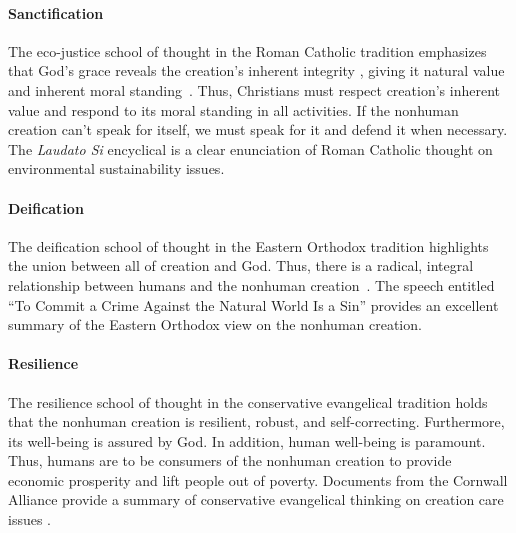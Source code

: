 \documentclass[12pt]{article}
\begin{document}
\paragraph{Sanctification} 
\label{sec:sanctification}

The eco-justice school of thought in the Roman Catholic tradition
emphasizes that God's grace reveals the creation's 
inherent integrity \autocite[19]{Jenkins:2008}, 
giving it natural value and inherent moral standing~\autocite{Joldersma:2019}. 
Thus, Christians must respect creation's inherent value and 
respond to its moral standing in all activities.
If the nonhuman creation can't speak for itself, 
we must speak for it and defend it when necessary.
The \emph{Laudato Si} encyclical \autocite{Pope-Francis:2015aa} 
is a clear enunciation of Roman Catholic thought
on environmental sustainability issues.

\paragraph{Deification} 
\label{sec:deification}

The deification school of thought in the Eastern Orthodox tradition
highlights the union between all of creation and God.
Thus, there is a radical, integral relationship between humans and 
the nonhuman creation~\autocite[93]{Jenkins:2008}.
The speech entitled ``To Commit a Crime Against the Natural World Is a Sin'' 
\autocite[133-136]{Bartholomew-I-of-Constantinople:2011aa}
provides an excellent summary of the Eastern Orthodox view
on the nonhuman creation.

\paragraph{Resilience} 
\label{sec:resilience}

The resilience school of thought in the conservative evangelical tradition
holds that the nonhuman creation is resilient, robust, and self-correcting.
Furthermore, its well-being is assured by God.
In addition, human well-being is paramount. 
Thus, humans are to be consumers of the nonhuman creation 
to provide economic prosperity and
lift people out of poverty.
Documents from the Cornwall Alliance 
provide a summary of conservative evangelical thinking on creation care issues
\autocite{Cornwall:2006aa}.
\end{document}

